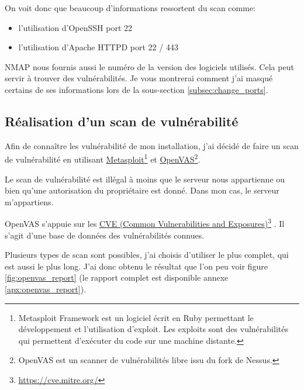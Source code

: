 \documentclass[]{report}
\newcommand\fnurl[2]{%
  \href{#1}{#2}\footnote{\url{#1}}%
}
\begin{document}
      On voit donc que beaucoup d'informations ressortent du scan comme:

      \begin{itemize}
        \item l'utilisation d'OpenSSH port 22
        \item l'utilisation d'Apache HTTPD port 22 / 443
      \end{itemize}

      NMAP nous fournis aussi le numéro de la version des logiciels utilisés. Cela peut servir à trouver des vulnérabilités. Je vous montrerai comment j'ai masqué certains de ses informations lors de la sous-section \ref{subsec:change_ports}.

    \subsection{Réalisation d'un scan de vulnérabilité}

      Afin de connaître les vulnérabilité de mon installation, j'ai décidé de faire un scan de vulnérabilité en utilisant \href{https://www.metasploit.com/}{Metasploit}\footnote{Metasploit Framework est un logiciel écrit en Ruby permettant le développement et l’utilisation d'exploit. Les exploits sont des vulnérabilités qui permettent d’exécuter du code sur une machine distante.} et \href{http://www.openvas.org/}{OpenVAS}\footnote{OpenVAS est un scanner de vulnérabilités libre issu du fork de Nessus.}.

      Le scan de vulnérabilité est illégal à moins que le serveur nous appartienne ou bien qu'une autorisation du propriétaire est donné. Dans mon cas, le serveur m’appartiens.

      OpenVAS s'appuie sur les \fnurl{https://cve.mitre.org/}{CVE (Common Vulnerabilities and Exposures)}. Il s'agit d'une base de données des vulnérabilités connues.

      Plusieurs types de scan sont possibles, j'ai choisis d'utiliser le plus complet, qui est aussi le plus long. J'ai donc obtenu le résultat que l'on peu voir figure \ref{fig:openvas_report} (le rapport complet est disponible annexe \ref{apx:openvas_report}).
\end{document}

